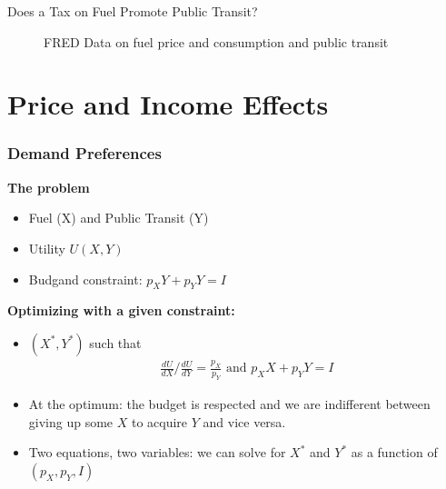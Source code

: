 \documentclass[handout]{beamer}
\begin{document}
\begin{frame}{Does a Tax on Fuel Promote Public Transit?}
\begin{figure}
\caption{FRED Data on fuel price and consumption and public transit}
\end{figure}


\end{frame}

\section{Price and Income Effects}

\begin{frame}\frametitle{Demand Preferences}
\textbf{The problem}
\begin{itemize}
\item Fuel (X) and Public Transit (Y)
\item Utility $U(X,Y)$
\item Budgand constraint: $p_X Y+ p_Y Y = I$
\end{itemize}

\textbf{Optimizing with a given constraint:}
\begin{itemize}
\item  $(X^*, Y^*)$ such that \begin{eqnarray*} \frac{dU}{dX}\Bigg/\frac{dU}{dY} = \frac{p_X}{p_Y} \textrm{ and }
p_X X + p_Y Y = I
\end{eqnarray*}

\item  At the optimum: the budget  is respected and we are indifferent between giving up some $X$ to acquire $Y$ and vice versa.
\item Two equations, two variables: we can solve for $X^*$ and $Y^*$ as a function of $(p_X,p_Y,I)$

\end{itemize}
\end{frame}
\end{document}

